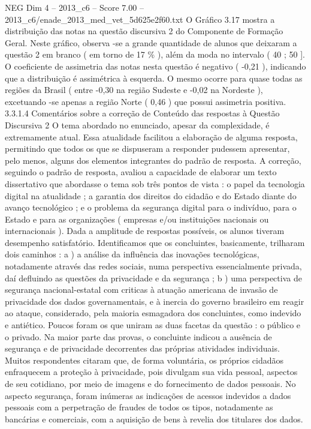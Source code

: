 \begin{textsample}{NEG Dim 4 – 2013\_c6 – Score 7.00 – 2013\_c6/enade\_2013\_med\_vet\_5d625e2f60.txt}
O Gráfico 3.17 mostra a distribuição das notas na questão discursiva 2 do Componente de Formação Geral.
Neste gráfico, observa -se a grande quantidade de alunos que deixaram a questão 2 em branco ( em torno de 17 \% ), além da moda no intervalo ( 40 ; 50 ].
O coeficiente de assimetria das notas nesta questão é negativo ( -0,21 ), indicando que a distribuição é assimétrica à esquerda.
O mesmo ocorre para quase todas as regiões da Brasil ( entre -0,30 na região Sudeste e -0,02 na Nordeste ), excetuando -se apenas a região Norte ( 0,46 ) que possui assimetria positiva. 3.3.1.4 Comentários sobre a correção de Conteúdo das respostas à Questão Discursiva 2 O tema abordado no enunciado, apesar da complexidade, é extremamente atual.
Essa atualidade facilitou a elaboração de alguma resposta, permitindo que todos os que se dispuseram a responder pudessem apresentar, pelo menos, alguns dos elementos integrantes do padrão de resposta.
A correção, seguindo o padrão de resposta, avaliou a capacidade de elaborar um texto dissertativo que abordasse o tema sob três pontos de vista : o papel da tecnologia digital na atualidade ; a garantia dos direitos do cidadão e do Estado diante do avanço tecnológico ; e o problema da segurança digital para o indivíduo, para o Estado e para as organizações ( empresas e/ou instituições nacionais ou internacionais ).
Dada a amplitude de respostas possíveis, os alunos tiveram desempenho satisfatório.
Identificamos que os concluintes, basicamente, trilharam dois caminhos : a ) a análise da influência das inovações tecnológicas, notadamente através das redes sociais, numa perspectiva essencialmente privada, daí defluindo as questões da privacidade e da segurança ; b ) uma perspectiva de segurança nacional-estatal com criticas à atuação americana de invasão de privacidade dos dados governamentais, e à inercia do governo brasileiro em reagir ao ataque, considerado, pela maioria esmagadora dos concluintes, como indevido e antiético.
Poucos foram os que uniram as duas facetas da questão : o público e o privado.
Na maior parte das provas, o concluinte indicou a ausência de segurança e de privacidade decorrentes das próprias atividades individuais.
Muitos respondentes citaram que, de forma voluntária, os próprios cidadãos enfraquecem a proteção à privacidade, pois divulgam sua vida pessoal, aspectos de seu cotidiano, por meio de imagens e do fornecimento de dados pessoais.
No aspecto segurança, foram inúmeras as indicações de acessos indevidos a dados pessoais com a perpetração de fraudes de todos os tipos, notadamente as bancárias e comerciais, com a aquisição de bens à revelia dos titulares dos dados.

\end{textsample}
